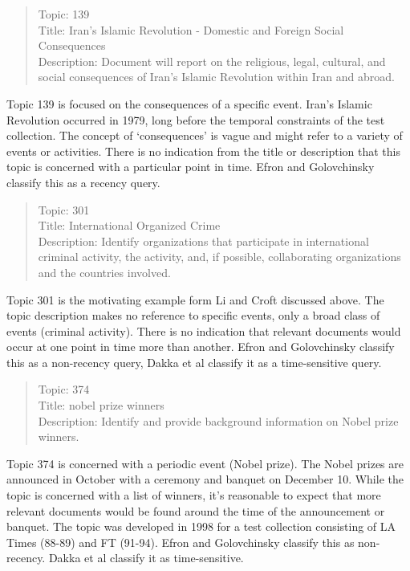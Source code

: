 \documentclass{sig-alternate}
\begin{document}
\begin{quote}
Topic: 139  \\
Title: Iran's Islamic Revolution - Domestic and Foreign Social  Consequences	 \\
Description: Document will report on the religious, legal, cultural, and social  consequences of Iran's Islamic Revolution within Iran and abroad. \\
\end{quote}

Topic 139 is focused on the consequences of a specific event. Iran's Islamic Revolution occurred in 1979, long before the temporal constraints of the test collection. The concept of `consequences' is vague and might refer to a variety of events or activities. There is no indication from the title or description that this topic is concerned with a particular point in time.  Efron and Golovchinsky classify this as a recency query.

\begin{quote}
Topic: 301 \\
Title: International Organized Crime \\
Description: Identify organizations that participate in international criminal activity, the activity, and, if possible, collaborating organizations and the countries involved. \\
\end{quote}

Topic 301 is the motivating example form Li and Croft discussed above.  The topic description makes no reference to specific events, only a broad class of events (criminal activity).  There is no indication that relevant documents would occur at one point in time more than another. Efron and Golovchinsky classify this as a non-recency query, Dakka et al classify it as a time-sensitive query.

\begin{quote}
Topic: 374 \\
Title: nobel prize winners \\
Description:  Identify and provide background information on Nobel prize winners. \\
\end{quote}

Topic 374 is concerned with a periodic event (Nobel prize). The Nobel prizes are announced in October with a ceremony and banquet on December 10. While the topic is concerned with a list of winners, it's reasonable to expect that more relevant documents would be found around the time of the announcement or banquet. The topic was developed in 1998 for a test collection consisting of LA Times (88-89) and FT (91-94). Efron and Golovchinsky classify this as non-recency. Dakka et al classify it as time-sensitive.
\end{document}
